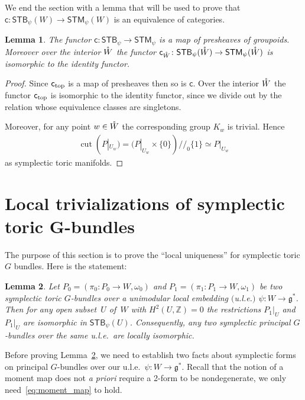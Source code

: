 \documentclass[pdftex]{sigma}
\numberwithin{equation}{section}
\newtheorem{Lemma}{Lemma}[section]
\begin{document}
We end the section with a lemma that will be used to prove that
$\textsf{c}\colon {\textsf{STB}}_\psi(W)\to {\textsf{STM}}_\psi (W)$ is an equivalence of categories.

\begin{Lemma} \label{lem: c is a map of stacks} The functor
  ${\textsf{c}}\colon {\textsf{STB}}_\psi \to {\textsf{STM}}_\psi$ is a map of presheaves of groupoids.
  Moreover over the interior ${\mathaccent23{W}}$ the functor ${\textsf{c}}_{{\mathaccent23{W}}}\colon
  {\textsf{STB}}_\psi({\mathaccent23{W}}) \to {\textsf{STM}}_\psi({\mathaccent23{W}})$ is isomorphic to the
  identity functor.
\end{Lemma}

\begin{proof}
  Since ${\textsf{c}_{\rm top}}$ is a map of presheaves then so is $\textsf{c}$.  Over the
  interior ${\mathaccent23{W}}$ the functor ${\textsf{c}}_{\rm top}$ is isomorphic to the
  identity functor, since we divide out by the relation whose
  equivalence classes are singletons.

  Moreover, for any point $w\in {\mathaccent23{W}}$ the corresponding group $K_w$
  is trivial.  Hence
\begin{gather*}
\operatorname{cut}(P|_{U_w}) = (P|_{U_w}\times \{0\})/\!/_0 \{1\} \simeq P|_{U_w}
\end{gather*}
as symplectic toric manifolds.
\end{proof}


\section[Local trivializations of symplectic toric $G$-bundles]{Local trivializations of symplectic toric $\boldsymbol{G}$-bundles}
\label{sec:local uniqueness STB}

The purpose of this section is to prove the ``local uniqueness''
for symplectic toric $G$ bundles.  Here is the statement:

\begin{Lemma} \label{loc-iso-stb} Let $P_0 = ( \pi_0 \colon P_0 \to
  W,\omega_0)$ and $P_1 = (\pi_1 \colon P_1 \to W,\omega_1)$ be two
  symplectic toric $G$-bundles over a unimodular local embedding $($u.l.e.$)$
  $\psi \colon W \to {\mathfrak g}^*$.
  Then for any  open subset~$U$ of~$W$ with $H^2(U,{\mathbb Z}) =0$ the
  restrictions $P_1|_U$ and $P_1|_U$ are isomorphic in ${\textsf{STB}}_\psi (U)$.
Consequently, any two  symplectic principal $G$-bundles over the
same u.l.e.\ are locally isomorphic.
\end{Lemma}
Before proving Lemma~\ref{loc-iso-stb}, we need to establish
two facts about symplectic forms on principal  $G$-bundles over our
u.l.e.\ $\psi \colon W \to {\mathfrak g}^*$.  Recall that the notion of a moment map
does not {\em a priori} require a 2-form to be nondegenerate,
we only need~\eqref{eq:moment_map} to hold.
\end{document}
